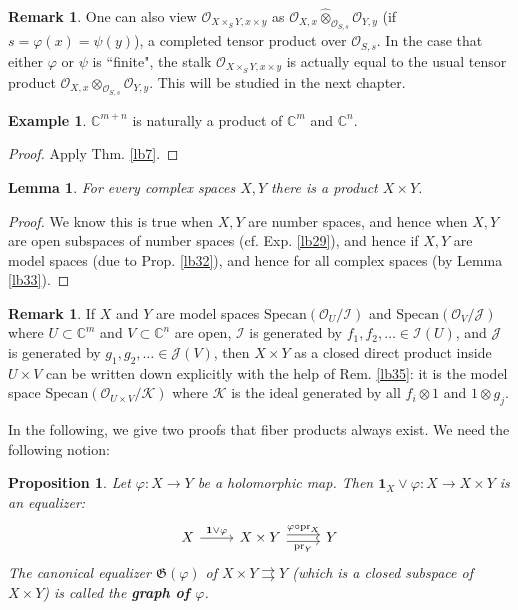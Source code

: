 \documentclass[12pt,b5paper,notitlepage]{report}
\theoremstyle{definition}
\newtheorem{eg}[df]{Example}
\newtheorem{rem}[df]{Remark}
\theoremstyle{plain}
\newtheorem{pp}[df]{Proposition}
\newtheorem{lm}[df]{Lemma}
\newcommand{\fk}{\mathfrak}
\newcommand{\mc}{\mathcal}
\newcommand{\wht}{\widehat}
\newcommand{\id}{\mathbf{1}}
\newcommand{\scr}{\mathscr}
\newcommand{\Cbb}{\mathbb C}
\newcommand{\pr}{\mathrm {pr}}
\newcommand{\Specan}{\mathrm{Specan}}
\numberwithin{equation}{section}
\begin{document}
\begin{rem}
One can also view $\scr O_{X\times_SY,x\times y}$ as $\scr O_{X,x}\wht\otimes_{\scr O_{S,s}}\scr O_{Y,y}$ (if $s=\varphi(x)=\psi(y)$), a completed tensor product over  $\scr O_{S,s}$. In the case that either $\varphi$ or $\psi$ is ``finite", the stalk $\scr O_{X\times_SY,x\times y}$ is actually equal to the usual tensor product $\scr O_{X,x}\otimes_{\scr O_{S,s}}\scr O_{Y,y}$. This will be studied in the next chapter. 
\end{rem}


\begin{eg}\label{lb182}
$\Cbb^{m+n}$ is naturally a product of $\Cbb^m$ and $\Cbb^n$.
\end{eg}

\begin{proof}
Apply Thm. \ref{lb7}.
\end{proof}




\begin{lm}
For every complex spaces $X,Y$ there is a product $X\times Y$.
\end{lm}

\begin{proof}
We know this is true when $X,Y$ are number spaces, and hence when $X,Y$ are open subspaces of number spaces (cf. Exp. \ref{lb29}), and hence if $X,Y$ are model spaces (due to Prop. \ref{lb32}), and hence for all complex spaces (by Lemma \ref{lb33}).
\end{proof}



\begin{rem}
If $X$ and $Y$ are model spaces $\Specan(\scr O_U/\mc I)$ and $\Specan(\scr O_V/\mc J)$ where $U\subset\Cbb^m$ and $V\subset\Cbb^n$ are open,  $\mc I$ is generated by $f_1,f_2,\dots\in\mc I(U)$, and $\mc J$ is generated by $g_1,g_2,\dots\in\mc J(V)$, then $X\times Y$ as a closed direct product inside $U\times V$ can be written down explicitly with the help of Rem. \ref{lb35}: it is the model space $\Specan(\scr O_{U\times V}/\mc K)$ where $\mc K$ is the ideal generated by all $f_i\otimes 1$ and $1\otimes g_j$.
\end{rem}



In the following, we give two proofs that fiber products always exist. We need the following notion:

\begin{pp}\label{lb80}
Let $\varphi:X\rightarrow Y$ be a holomorphic map. Then $\id_X\vee\varphi:X\rightarrow X\times Y$ is an equalizer:
\begin{equation}
\begin{tikzcd}
X \arrow[r,"\id\vee\varphi"] & X\times Y \arrow[r, shift left, "\varphi\circ\pr_X"] \arrow[r, shift right, "\pr_Y"'] & Y
\end{tikzcd}
\end{equation}
The canonical equalizer $\fk G(\varphi)$ of $X\times Y\rightrightarrows Y$ (which is a closed subspace of $X\times Y$) is called the \textbf{graph of $\varphi$}. 
\end{pp}
\end{document}

